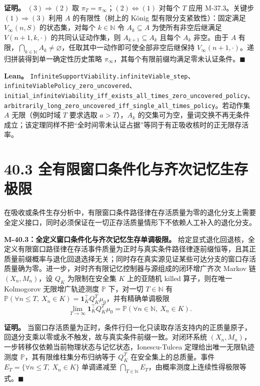 \documentclass[
  11pt,
  oneside]{book}
\begin{document}
\textbf{证明。} \((3)\Rightarrow(2)\) 取 \(\pi_T=\pi_\infty\)；\((2)\Leftrightarrow(1)\) 对每个 \(T\) 应用 M-37.3。关键步 \((1)\Rightarrow(3)\) 利用 \(A\) 的有限性（树上的 König 型有限分支紧致性）：固定满足 \(V_\infty(n,S)\) 的状态集，对每个 \(k\in\mathbb N\) 令 \(A_k\subseteq A\) 为使所有非空后继满足 \(V(n+1,k,\cdot)\) 的共同认证动作集，则 \(A_{k+1}\subseteq A_k\) 且每个 \(A_k\) 非空。由于 \(A\) 有限，\(\bigcap_{k\in\mathbb N}A_k\neq\varnothing\)，任取其中一动作即可使全部非空后继保持 \(V_\infty(n+1,\cdot)\)。递归拼装得到单一确定性历史策略 \(\pi_\infty\)，其每个有限前缀均满足零未认证条件。\(\blacksquare\)

\textbf{Lean。} \nolinkurl{InfiniteSupportViability.infiniteViable_step}、\nolinkurl{infiniteViablePolicy_zero_uncovered}、\nolinkurl{initial_infiniteViability_iff_exists_all_times_zero_uncovered_policy}、\nolinkurl{arbitrarily_long_zero_uncovered_iff_single_all_times_policy}。若动作集 \(A\) 无限（例如时域 \(T\) 要求选取 \(a>T\)），\(A_k\) 的交集可为空，量词交换不再无条件成立；该定理同样不把``全时间零未认证占据''等同于有正吸收核时的正无限存活率。

\section{40.3 全有限窗口条件化与齐次记忆生存极限}\label{ux5168ux6709ux9650ux7a97ux53e3ux6761ux4ef6ux5316ux4e0eux9f50ux6b21ux8bb0ux5fc6ux751fux5b58ux6781ux9650}

在吸收或条件生存分析中，有限窗口条件路径律在存活质量为零的退化分支上需要全定义接口，同时必须保证在一切正存活质量情形下不依赖人工补入的退化分支。

\hypertarget{m-40-3}{}\label{m-40-3}

\textbf{M-40.3：全定义窗口条件化与齐次记忆生存单调极限。} 给定显式退化回退核，全定义有限窗口路径律在存活事件质量为正时与真实条件路径律逐前缀恒等，且其正质量前缀概率与退化回退选择无关；同时存在真实源见证某些可达分支的窗口存活质量确为零。进一步，对时齐有限记忆控制器与源组成的闭环增广齐次 Markov 链 \((X_n,M_n)\)，设 \(Q_K\) 为限制在安全集 \(K\) 上的亚随机 killed 算子，则在唯一 Kolmogorov 无限增广轨迹测度 \(\mathbb P\) 下，对一切 \(T\in\mathbb N\) 有 \(\mathbb P(\forall n\le T,\ X_n\in K)=\mathbf 1_K^\top Q_K^T\mu_0\)，并有精确单调极限 \[\lim_{T\to\infty}\mathbf 1_K^\top Q_K^T\mu_0=\mathbb P(\forall n\in\mathbb N,\ X_n\in K).\]

\textbf{证明。} 当窗口存活质量为正时，条件行归一化只读取存活支持内的正质量原子，回退分支乘以零或永不触发，故与真实条件前缀一致。对闭环系统 \((X_n,M_n)\)，一步转移仅依赖当前物理状态与记忆状态，Ionescu-Tulcea 定理给出唯一无限轨迹测度 \(\mathbb P\)，其有限维柱集分布归纳等于 \(Q_K^T\) 在安全集上的总质量。事件 \(E_T=\{\forall n\le T,\ X_n\in K\}\) 单调递减至 \(\bigcap_{T\in\mathbb N}E_T\)，由概率测度上连续性得极限等式。\(\blacksquare\)
\end{document}
